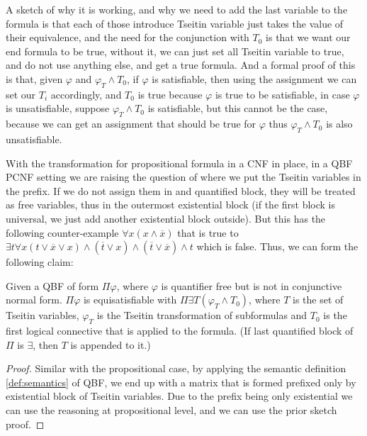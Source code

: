 A sketch of why it is working, and why we need to add the last variable to the formula is that each of those introduce Tseitin variable just takes the value of their equivalence, and the need for the conjunction with $T_0$ is that we want our end formula to be true, without it, we can just set all Tseitin variable to true, and do not use anything else, and get a true formula. And a formal proof of this is that, given $\varphi$ and $\varphi_T \land T_0$, if $\varphi$ is satisfiable, then using the assignment we can set our $T_i$ accordingly, and $T_0$ is true because $\varphi$ is true to be satisfiable, in case $\varphi$ is unsatisfiable, suppose $\varphi_T \land T_0$ is satisfiable, but this cannot be the case, because we can get an assignment that should be true for $\varphi$ thus $\varphi_T \land T_0$ is also unsatisfiable.

With the transformation for propositional formula in a CNF in place, in a QBF PCNF setting we are raising the question of where we put the Tseitin variables in the prefix. If we do not assign them in and quantified block, they will be treated as free variables, thus in the outermost existential block (if the first block is universal, we just add another existential block outside). But this has the following counter-example $\forall x (x \land \overline{x})$ that is true to $\exists t \forall x (t \lor \overline{x} \lor x) \land (\overline{t} \lor x) \land (\overline{t} \lor \overline{x}) \land t$ which is false. Thus, we can form the following claim:

\begin{claim}
    Given a QBF of form $\Pi\varphi$, where $\varphi$ is quantifier free but is not in conjunctive normal form. $\Pi\varphi$ is equisatisfiable with $\Pi \exists T (\varphi_T \land T_0)$, where $T$ is the set of Tseitin variables, $\varphi_T$ is the Tseitin transformation of subformulas and $T_0$ is the first logical connective that is applied to the formula. (If last quantified block of $\Pi$ is $\exists$, then $T$ is appended to it.)
\end{claim}

\begin{proof}
    Similar with the propositional case, by applying the semantic definition \ref{def:semantics} of QBF, we end up with a matrix that is formed prefixed only by existential block of Tseitin variables. Due to the prefix being only existential we can use the reasoning at propositional level, and we can use the prior sketch proof.
\end{proof}